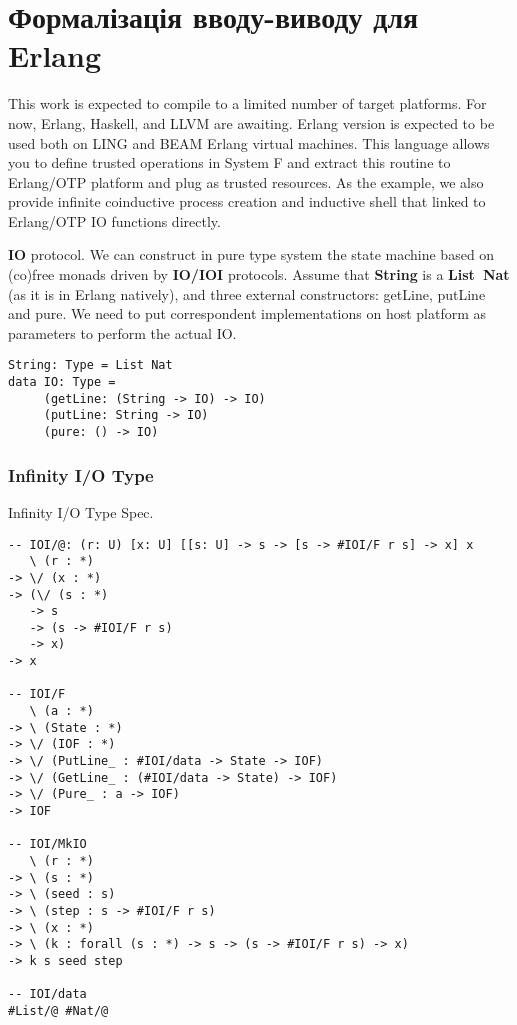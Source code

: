 \newpage
\section{Формалізація вводу-виводу для Erlang}

This work is expected to compile to a limited number of target platforms.
For now, Erlang, Haskell, and LLVM are awaiting.
Erlang version is expected to be used both on LING and BEAM Erlang virtual machines.
This language allows you to define trusted operations in System F and extract this routine to Erlang/OTP platform and plug as trusted resources.
As the example, we also provide infinite coinductive process creation and inductive shell that linked to Erlang/OTP IO functions directly.

{\bf IO} protocol.
We can construct in pure type system the state machine based on (co)free monads driven by {\bf IO/IOI} protocols.
Assume that {\bf String} is a {\bf List\ Nat} (as it is in Erlang natively), and three external constructors: getLine, putLine and pure.
We need to put correspondent implementations on host platform as parameters to perform the actual IO.

\begin{lstlisting}
String: Type = List Nat
data IO: Type =
     (getLine: (String -> IO) -> IO)
     (putLine: String -> IO)
     (pure: () -> IO)
\end{lstlisting}

\newpage
\subsubsection{Infinity I/O Type}

Infinity I/O Type Spec.

\begin{lstlisting}
-- IOI/@: (r: U) [x: U] [[s: U] -> s -> [s -> #IOI/F r s] -> x] x
   \ (r : *)
-> \/ (x : *)
-> (\/ (s : *)
   -> s
   -> (s -> #IOI/F r s)
   -> x)
-> x

-- IOI/F
   \ (a : *)
-> \ (State : *)
-> \/ (IOF : *)
-> \/ (PutLine_ : #IOI/data -> State -> IOF)
-> \/ (GetLine_ : (#IOI/data -> State) -> IOF)
-> \/ (Pure_ : a -> IOF)
-> IOF

-- IOI/MkIO
   \ (r : *)
-> \ (s : *)
-> \ (seed : s)
-> \ (step : s -> #IOI/F r s)
-> \ (x : *)
-> \ (k : forall (s : *) -> s -> (s -> #IOI/F r s) -> x)
-> k s seed step

-- IOI/data
#List/@ #Nat/@
\end{lstlisting}

